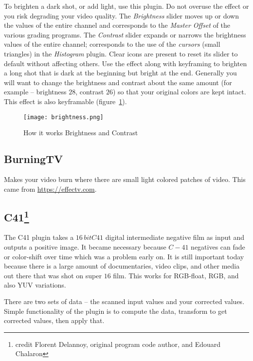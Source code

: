 To brighten a dark shot, or add light, use this plugin. Do not overuse the effect or you risk degrading your video quality.
The \textit{Brightness} slider moves up or down the values of the entire channel and corresponds to the \textit{Master Offset} of the various grading programs.
The \textit{Contrast} slider expands or narrows the brightness values of the entire channel; corresponds to the use of the \textit{cursors} (small triangles) in the \textit{Histogram} plugin. Clear icons are present to reset its slider to default without affecting others.
Use the effect along with keyframing to brighten a long shot that is dark at the beginning but bright at the end. Generally you will want to change the brightness and contrast about the same amount (for example -- brightness $28$, contrast $26$) so that your original colors are kept intact. This effect is also keyframable (figure~\ref{fig:brightness}).

\begin{figure}[htpb]
    \centering
    \texttt{[image: brightness.png]}
    \caption{How it works Brightness and Contrast}
    \label{fig:brightness}
\end{figure}

\subsection{BurningTV}%
\label{sub:burningtv}

Makes your video burn where there are small light colored patches of video. This came from \url{https://effectv.com}.

\subsection[C41]{C41\protect\footnote{credit Florent Delannoy, original program code author, and Edouard Chalaron}}%
\label{sub:c41}

The C41 plugin takes a $16\,bit C41$ digital intermediate negative film as input and outputs a positive image. It became necessary because $C-41$ negatives can fade or color-shift over time which was a problem early on. It is still important today because there is a large amount of documentaries, video clips, and other media out there that was shot on super $16$ film. This works for RGB-float, RGB, and also YUV variations.

There are two sets of data -- the scanned input values and your corrected values. Simple functionality of the plugin is to compute the data, transform to get corrected values, then apply that.

